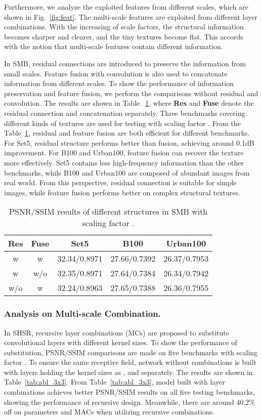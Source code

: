 \documentclass[manuscript,screen]{acmart}
\begin{document}
Furthermore, we analyze the exploited features from different scales, which are shown in Fig.~\ref{fig:feat}. The multi-scale features are exploited from different layer combinations. With the increasing of scale factors, the structural information becomes sharper and clearer, and the tiny textures become flat. This accords with the notion that multi-scale features contain different information.

In SMB, residual connections are introduced to preserve the information from small scales. Feature fusion with  convolution is also used to concatenate information from different scales. To show the performance of information preservation and feature fusion, we perform the comparisons without residual and  convolution. The results are shown in Table.~\ref{tab:abl_pmrb}, where \textbf{Res} and \textbf{Fuse} denote the residual connection and concatenation separately. Three benchmarks covering different kinds of textures are used for testing with scaling factor .
From the Table~\ref{tab:abl_pmrb}, residual and feature fusion are both efficient for different benchmarks. For Set5, residual structure performs better than fusion, achieving around 0.1dB improvement. For B100 and Urban100, feature fusion can recover the texture more effectively. Set5 contains less high-frequency information than the other benchmarks, while B100 and Urban100 are composed of abundant images from real world. From this perspective, residual connection is suitable for simple images, while feature fusion performs better on complex structural textures.

\begin{table}[t]
	\centering
	\caption{PSNR/SSIM results of different structures in SMB with scaling factor .}
	\label{tab:abl_pmrb}
\begin{tabular}{|c|c|c|c|c|}
		\hline  
		\textbf{Res}& \textbf{Fuse}& \textbf{Set5}& \textbf{B100} &\textbf{Urban100} \\
		\hline
		\hline
		w&w& 32.34/0.8971& 27.66/0.7392& 26.37/0.7953\\ 
		w&w/o& 32.35/0.8971& 27.64/0.7384& 26.34/0.7942\\
		w/o&w& 32.24/0.8963& 27.65/0.7388& 26.36/0.7955\\
		\hline
	\end{tabular}
\end{table}

\subsubsection{Analysis on Multi-scale Combination.}
In SHSR, recursive layer combinations (MCs) are proposed to substitute convolutional layers with different kernel sizes. To show the performance of substitution, PSNR/SSIM comparisons are made on five benchmarks with scaling factor . To ensure the same receptive field, network without combinations is built with layers holding the kernel sizes as ,  and  separately. The results are shown in Table~\ref{tab:abl_3x3}.
From Table~\ref{tab:abl_3x3}, model built with layer combinations achieves better PSNR/SSIM results on all five testing benchmarks, showing the performance of recursive design. Meanwhile, there are around 40.2\% off on parameters and MACs when utilizing recursive combinations. 
\end{document}
